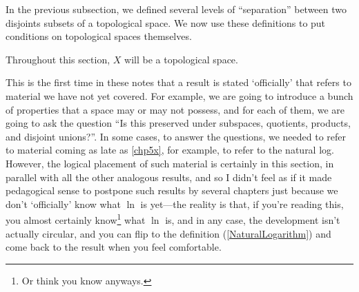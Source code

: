 In the previous subsection, we defined several levels of ``separation'' between two disjoints subsets of a topological space.  We now use these definitions to put conditions on topological spaces themselves.

Throughout this section, $X$ will be a topological space.
\begin{important}
This is the first time in these notes that a result is stated `officially' that refers to material we have not yet covered.  For example, we are going to introduce a bunch of properties that a space may or may not possess, and for each of them, we are going to ask the question ``Is this preserved under subspaces, quotients, products, and disjoint unions?''.  In some cases, to answer the questions, we needed to refer to material coming as late as \cref{chp5x}, for example, to refer to the natural log.  However, the logical placement of such material is certainly in this section, in parallel with all the other analogous results, and so I didn't feel as if it made pedagogical sense to postpone such results by several chapters just because we don't `officially' know what $\ln$ is yet---the reality is that, if you're reading this, you almost certainly know\footnote{Or think you know anyways.} what $\ln$ is, and in any case, the development isn't actually circular, and you can flip to the definition (\cref{NaturalLogarithm}) and come back to the result when you feel comfortable.
\end{important}

